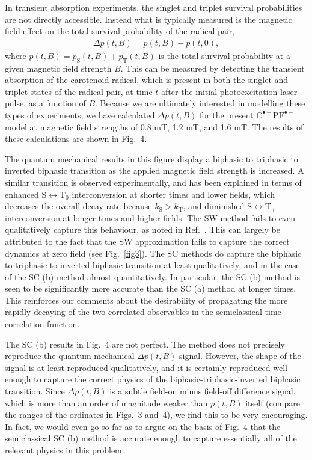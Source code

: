\documentclass[%
aip,
jcp,%
amsmath,amssymb,
reprint%
]{revtex4-1}
\newcommand{\sing}{\ensuremath{\mathrm{S}}}
\newcommand{\trip}{\ensuremath{\mathrm{T}}}
\newcommand{\CPFrp}{$\text{C}^{\bullet +}\text{PF}^{\bullet-}$}
\begin{document}
In transient absorption experiments, the singlet and triplet survival probabilities are not directly accessible. Instead what is typically measured is the magnetic field effect on the total survival probability of the radical pair,
\begin{align}
\Delta p(t,B) = p(t,B) - p(t,0),
\end{align}
where $p(t,B) = p_\sing(t,B) + p_\trip(t,B)$ is the total survival probability at a given magnetic field strength $B$. This can be measured by detecting the transient absorption of the carotenoid radical, which is present in both the singlet and triplet states of the radical pair, at time $t$ after the initial photoexcitation laser pulse, as a function of $B$.\cite{Maeda2008,Lewis2018} Because we are ultimately interested in modelling these types of experiments, we have calculated $\Delta p(t,B)$ for the present \CPFrp model at magnetic field strengths of 0.8 mT, 1.2 mT, and 1.6 mT. The results of these calculations are shown in Fig.~4.

The quantum mechanical results in this figure display a biphasic to triphasic to inverted biphasic transition as the applied magnetic field strength is increased. A similar transition is observed experimentally,\cite{Lewis2018} and has been explained in terms of enhanced $\sing\leftrightarrow\trip_0$ interconversion at shorter times and lower fields, which decreases the overall decay rate because $k_\sing > k_\trip$, and diminished $\sing\leftrightarrow\trip_\pm$ interconversion at longer times and higher fields.\cite{Lewis2018} The SW method fails to even qualitatively capture this behaviour, as noted in Ref.~. This can largely be attributed to the fact that the SW approximation fails to capture the correct dynamics at zero field (see Fig.~\ref{fig3}). The SC methods do capture the biphasic to triphasic to inverted biphasic transition at least qualitatively, and in the case of the SC (b) method almost quantitatively. In particular, the SC (b) method is seen to be significantly more accurate than the SC (a) method at longer times. This reinforces our comments about the desirability of propagating the more rapidly decaying of the two correlated observables in the semiclassical time correlation function.

The SC (b) results in Fig.~4 are not perfect. The method does not precisely reproduce the quantum mechanical $\Delta p(t,B)$ signal. However, the shape of the signal is at least reproduced qualitatively, and it is certainly reproduced well enough to capture the correct physics of the biphasic-triphasic-inverted biphasic transition.\cite{Lewis2018} Since $\Delta p(t,B)$ is a subtle field-on minus field-off difference signal, which is more than an order of magnitude weaker than $p(t,B)$ itself (compare the ranges of the ordinates in Figs.~3 and~4), we find this to be very encouraging. In fact, we would even go so far as to argue on the basis of Fig.~4 that the semiclassical SC (b) method is accurate enough to capture essentially all of the relevant physics in this problem.
\end{document}
